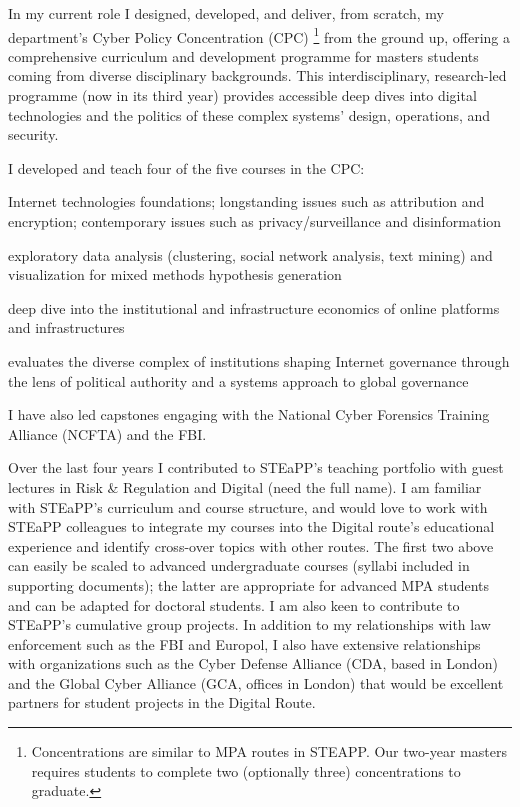 \documentclass[11pt]{letter}
\begin{document}
\begin{letter}
In my current role I designed, developed, and deliver, from scratch, my department's Cyber Policy Concentration (CPC)%
  \footnote{Concentrations are similar to MPA routes in STEAPP.  Our two-year masters requires students to complete two (optionally three) concentrations to graduate.} 
from the ground up, offering a comprehensive curriculum and development programme for masters students coming from diverse disciplinary backgrounds.
%
This interdisciplinary, research-led programme (now in its third year) provides accessible deep dives into digital technologies and the politics of these complex systems' design, operations, and security.
%

I developed and teach four of the five courses in the CPC:
%
\begin{description}[leftmargin=0.5cm]
  \item[Introduction to Cyber Policy] Internet technologies foundations; longstanding issues such as attribution and encryption; contemporary issues such as privacy/surveillance and disinformation

  \item[Data Science and Visualization for Policy Analysis] exploratory data analysis (clustering, social network analysis, text mining) and visualization for mixed methods hypothesis generation

  \item[Internet Infrastructure: Platforms and Politics] deep dive into the institutional and infrastructure economics of online platforms and infrastructures

  \item[Advanced Cyber Policy] evaluates the diverse complex of institutions shaping Internet governance through the lens of political authority and a systems approach to global governance
\end{description}
%
I have also led capstones engaging with the National Cyber Forensics Training Alliance (NCFTA) and the FBI.

Over the last four years I  contributed to STEaPP's teaching portfolio with guest lectures in Risk \& Regulation and Digital (need the full name).
%
I am familiar with STEaPP's curriculum and course structure, and would love to work with STEaPP colleagues to integrate my courses into the Digital route's educational experience and identify cross-over topics with other routes.
%
The first two above can easily be scaled to advanced undergraduate courses (syllabi included in supporting documents); the latter are appropriate for advanced MPA students and can be adapted for doctoral students.
%
I am also keen to contribute to STEaPP's cumulative group projects.
%
In addition to my relationships with law enforcement such as the FBI and  Europol, I also have extensive relationships with organizations such as the Cyber Defense Alliance (CDA, based in London) and the Global Cyber Alliance (GCA, offices in London) that would be excellent partners for student projects in the Digital Route.



\end{letter}
\end{document}
